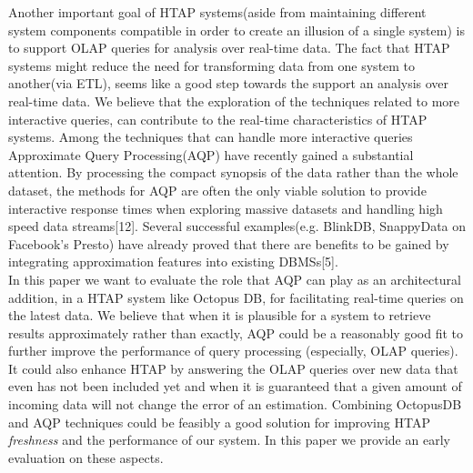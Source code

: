 \documentclass[10pt, conference, compsocconf]{IEEEtran}
\begin{document}
Another important goal of HTAP systems(aside from maintaining different system components compatible in order to create an illusion of a single system) is to support OLAP queries for analysis over real-time data. The fact that HTAP systems might reduce the need for transforming data from one system to another(via ETL), seems like a good step towards the support an analysis over real-time data. We believe that the exploration of the techniques related to more interactive queries, can contribute to the real-time characteristics of HTAP systems. Among the techniques that can handle more interactive queries Approximate Query Processing(AQP) have recently gained a substantial attention. By processing the compact synopsis of the data rather than the whole dataset, the methods for AQP are often the only viable solution to provide interactive response times when exploring massive datasets and handling high speed data streams[12]. Several successful examples(e.g. BlinkDB, SnappyData on Facebook's Presto) have already proved that there are benefits to be gained by integrating approximation features into existing DBMSs[5].\\
In this paper we want to evaluate the role that AQP can play as an architectural addition, in a HTAP system like Octopus DB, for facilitating real-time queries on the latest data. %
We believe that when it is plausible for a system to retrieve results approximately rather than exactly, AQP could be a reasonably good fit to further improve the performance of query processing (especially, OLAP queries). It could also enhance HTAP by answering the OLAP queries over new data that even has not been included yet and when it is guaranteed that a given amount of incoming data will not change the error of an estimation. Combining OctopusDB and AQP techniques could be feasibly a good solution for improving HTAP \textit{freshness} and the performance of our system. In this paper we provide an early evaluation on these aspects.\\
\end{document}
